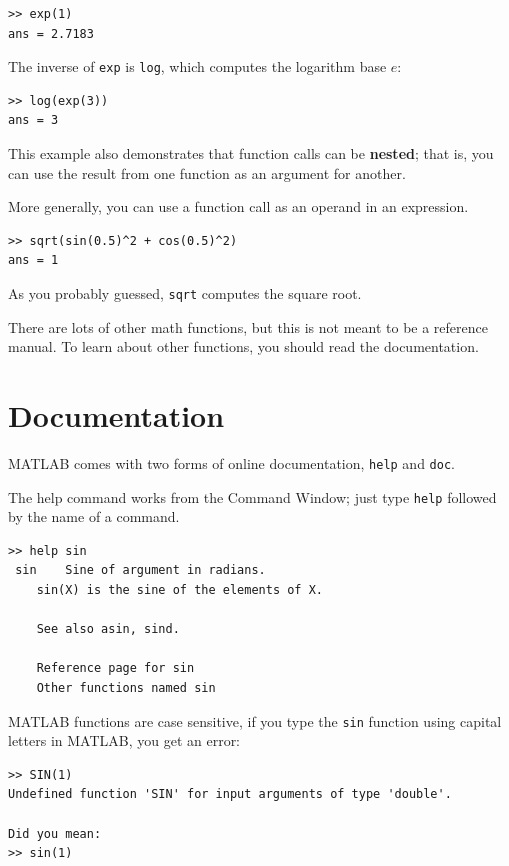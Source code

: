 \documentclass{book}
\begin{document}
\begin{verbatim}
>> exp(1)
ans = 2.7183
\end{verbatim}

The inverse of {\tt exp} is {\tt log}, which computes the logarithm
base $e$:

\begin{verbatim}
>> log(exp(3))
ans = 3
\end{verbatim}

This example also demonstrates that function calls can be {\bf nested};
that is, you can use the result from one function as an argument for
another.

More generally, you can use a function call as an operand in an expression.

\begin{verbatim}
>> sqrt(sin(0.5)^2 + cos(0.5)^2)
ans = 1
\end{verbatim}

As you probably guessed, {\tt sqrt} computes the square root.

There are lots of other math functions, but this is not meant to
be a reference manual.  To learn about other functions, you should
read the documentation.


\section{Documentation}

MATLAB comes with two forms of online documentation, {\tt help}
and {\tt doc}.

The help command works from the Command Window; just type {\tt help}
followed by the name of a command.

\begin{verbatim}
>> help sin
 sin    Sine of argument in radians.
    sin(X) is the sine of the elements of X.
 
    See also asin, sind.

    Reference page for sin
    Other functions named sin
\end{verbatim}

MATLAB functions are case sensitive, if you type the {\tt sin} function using capital letters
in MATLAB, you get an error:

\begin{verbatim}
>> SIN(1)
Undefined function 'SIN' for input arguments of type 'double'.
 
Did you mean:
>> sin(1)
\end{verbatim}
\end{document}
